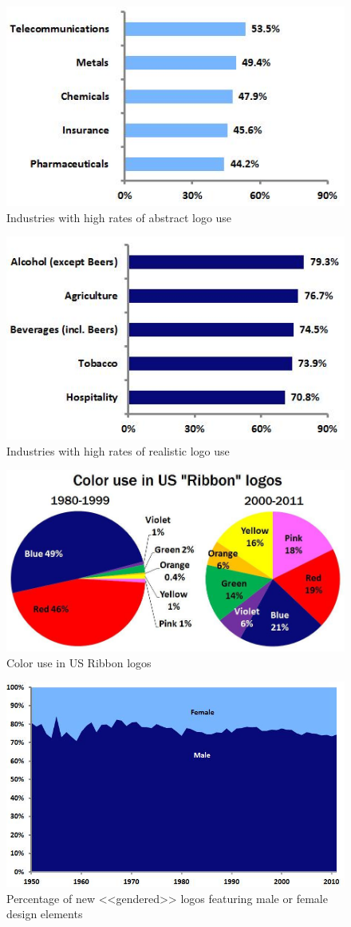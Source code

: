 \begin{figure}[ht]
  \centering
  \includegraphics[width=.5\linewidth]{images/supplement/emblemetrics/highabstract}
  \caption[]{Industries with high rates of abstract logo use}
  \label{fig:emblemetrics:high-abstract}
\end{figure}

\begin{figure}[ht]
  \centering
  \includegraphics[width=.5\linewidth]{images/supplement/emblemetrics/highrealistic}
  \caption[]{Industries with high rates of realistic logo use}
  \label{fig:emblemetrics:high-realistic}
\end{figure}

\begin{figure}[ht]
  \centering
  \includegraphics[width=.5\linewidth]{images/supplement/emblemetrics/coloruse}
  \caption[]{Color use in US Ribbon logos}
  \label{fig:emblemetrics:color-use}
\end{figure}

\begin{figure}[ht]
  \centering
  \includegraphics[width=.5\linewidth]{images/supplement/emblemetrics/malefemale}
  \caption[]{Percentage of new <<gendered>> logos featuring male or female design elements}
  \label{fig:emblemetrics:male-female}
\end{figure}

